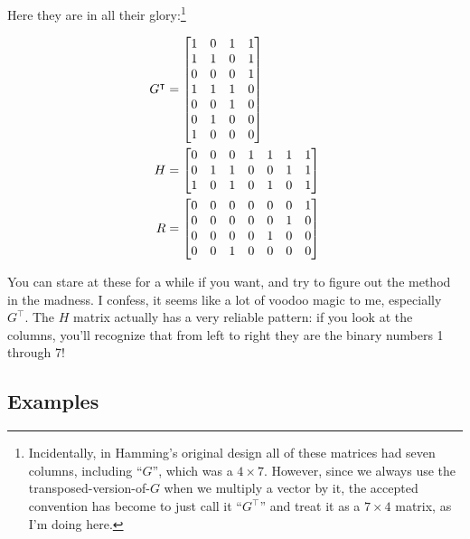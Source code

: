 \begin{alttitles}
Here they are in all their glory:\footnote{Incidentally, in Hamming's original
 design all of these matrices had seven columns, including
``$G$'', which was a $4\times 7$. However, since we always use the
transposed-version-of-$G$ when we multiply a vector by it, the accepted
convention has become to just call it ``$G^\intercal$'' and treat it as a
$7\times 4$ matrix, as I'm doing here.}

\vspace{-.15in}
\begin{align*}
G^\intercal &=
\begin{bmatrix}
1 & 0 & 1 & 1\\
1 & 1 & 0 & 1\\
0 & 0 & 0 & 1\\
1 & 1 & 1 & 0\\
0 & 0 & 1 & 0\\
0 & 1 & 0 & 0\\
1 & 0 & 0 & 0\\
\end{bmatrix} \\
\medskip
H &=
\begin{bmatrix}
0 & 0 & 0 & 1 & 1 & 1 & 1 \\
0 & 1 & 1 & 0 & 0 & 1 & 1 \\
1 & 0 & 1 & 0 & 1 & 0 & 1 \\
\end{bmatrix} \\
\medskip
R &=
\begin{bmatrix}
0 & 0 & 0 & 0 & 0 & 0 & 1 \\
0 & 0 & 0 & 0 & 0 & 1 & 0 \\
0 & 0 & 0 & 0 & 1 & 0 & 0 \\
0 & 0 & 1 & 0 & 0 & 0 & 0 \\
\end{bmatrix}
\end{align*}
\vspace{-.15in}

You can stare at these for a while if you want, and try to figure out the
method in the madness. I confess, it seems like a lot of voodoo magic to me,
especially $G^\intercal$. The $H$ matrix actually has a very reliable pattern:
if you look at the columns, you'll recognize that from left to right they are
the binary numbers 1 through 7!

\subsection{Examples}


\end{alttitles}

